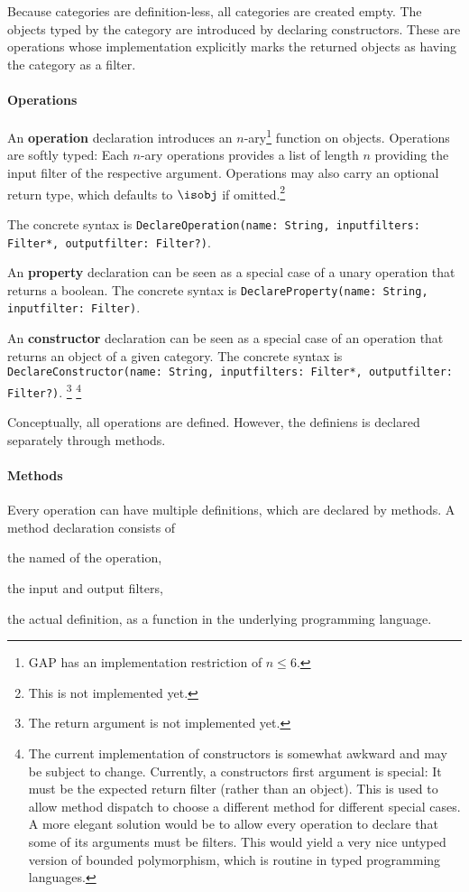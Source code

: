 Because categories are definition-less, all categories are created empty.
The objects typed by the category are introduced by declaring constructors.
These are operations whose implementation explicitly marks the returned objects as having the category as a filter.

\paragraph{Operations}
An \textbf{operation} declaration introduces an $n$-ary\footnote{GAP has an implementation restriction of $n\leq 6$.} function on objects.
Operations are softly typed: Each $n$-ary operations provides a list of length $n$ providing the input filter of the respective argument.
Operations may also carry an optional return type, which defaults to $\isobj$ if omitted.\footnote{This is not implemented yet.}

The concrete syntax is
 \lstinline|DeclareOperation(name: String, inputfilters: Filter*, outputfilter: Filter?)|.

An \textbf{property} declaration can be seen as a special case of a unary operation that returns a boolean.
The concrete syntax is \lstinline|DeclareProperty(name: String, inputfilter: Filter)|.

An \textbf{constructor} declaration can be seen as a special case of an operation that returns an object of a given category.
The concrete syntax is \lstinline|DeclareConstructor(name: String, inputfilters: Filter*, outputfilter: Filter?)|.
\footnote{The return argument is not implemented yet.}
\footnote{The current implementation of constructors is somewhat awkward and may be subject to change. Currently, a constructors first argument is special: It must be the expected return filter (rather than an object). This is used to allow method dispatch to choose a different method for different special cases.
A more elegant solution would be to allow every operation to declare that some of its arguments must be filters.
This would yield a very nice untyped version of bounded polymorphism, which is routine in typed programming languages.}

Conceptually, all operations are defined.
However, the definiens is declared separately through methods.

\paragraph{Methods}
Every operation can have multiple definitions, which are declared by methods.
A method declaration consists of
\begin{compactitem}
  \item the named of the operation,
  \item the input and output filters,
  \item the actual definition, as a function in the underlying programming language.
\end{compactitem}

